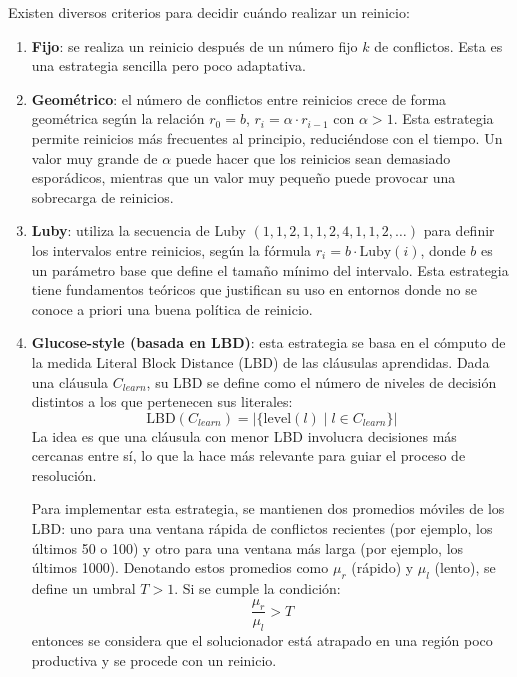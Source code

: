 Existen diversos criterios para decidir cuándo realizar un reinicio:

\begin{enumerate}
    \item \textbf{Fijo}: se realiza un reinicio después de un número fijo $k$ de conflictos. Esta es una estrategia sencilla pero poco adaptativa.

    \item \textbf{Geométrico}: el número de conflictos entre reinicios crece de forma geométrica según la relación $r_0 = b$, $r_i = \alpha \cdot r_{i-1}$ con $\alpha > 1$. Esta estrategia permite reinicios más frecuentes al principio, reduciéndose con el tiempo. Un valor muy grande de $\alpha$ puede hacer que los reinicios sean demasiado esporádicos, mientras que un valor muy pequeño puede provocar una sobrecarga de reinicios.

    \item \textbf{Luby}: utiliza la secuencia de Luby $(1,1,2,1,1,2,4,1,1,2,\dots)$ para definir los intervalos entre reinicios, según la fórmula $r_i = b \cdot \text{Luby}(i)$, donde $b$ es un parámetro base que define el tamaño mínimo del intervalo. Esta estrategia tiene fundamentos teóricos que justifican su uso en entornos donde no se conoce a priori una buena política de reinicio.

    \item \textbf{Glucose-style (basada en LBD)}: esta estrategia se basa en el cómputo de la medida Literal Block Distance (LBD) de las cláusulas aprendidas. Dada una cláusula $C_{learn}$, su LBD se define como el número de niveles de decisión distintos a los que pertenecen sus literales:
    \begin{equation*}
        \text{LBD}(C_{learn}) = |\{ \text{level}(l)\mid l \in C_{learn} \}|
    \end{equation*}
    La idea es que una cláusula con menor LBD involucra decisiones más cercanas entre sí, lo que la hace más relevante para guiar el proceso de resolución. 

    Para implementar esta estrategia, se mantienen dos promedios móviles de los LBD: uno para una ventana rápida de conflictos recientes (por ejemplo, los últimos 50 o 100) y otro para una ventana más larga (por ejemplo, los últimos 1000). Denotando estos promedios como $\mu_r$ (rápido) y $\mu_l$ (lento), se define un umbral $T > 1$. Si se cumple la condición:
    \begin{equation*}
        \frac{\mu_r}{\mu_l} > T
    \end{equation*}
    entonces se considera que el solucionador está atrapado en una región poco productiva y se procede con un reinicio.
\end{enumerate}

